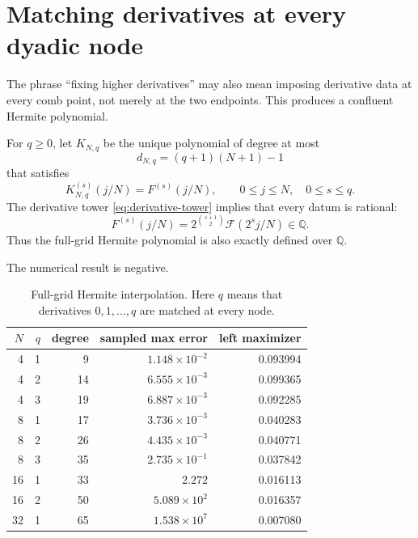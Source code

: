 \documentclass[11pt,oneside]{article}
\theoremstyle{definition}
\theoremstyle{remark}
\newcommand{\Q}{\mathbb Q}
\newcommand{\Fext}{\mathcal F}
\begin{document}
\section{Matching derivatives at every dyadic node}
\label{sec:full-hermite}

The phrase ``fixing higher derivatives'' may also mean imposing derivative data at every comb point, not merely at the two endpoints.  This produces a confluent Hermite polynomial.

For $q\ge0$, let $K_{N,q}$ be the unique polynomial of degree at most
\begin{equation}
 d_{N,q}=(q+1)(N+1)-1
 \label{eq:full-hermite-degree}
\end{equation}
that satisfies
\begin{equation}
 K_{N,q}^{(s)}(j/N)=F^{(s)}(j/N),
 \qquad 0\le j\le N,\quad0\le s\le q.
 \label{eq:full-hermite-conditions}
\end{equation}
The derivative tower \eqref{eq:derivative-tower} implies that every datum is rational:
\begin{equation}
 F^{(s)}(j/N)=2^{\binom{s+1}{2}}\Fext(2^s j/N)\in\Q.
 \label{eq:dyadic-derivatives}
\end{equation}
Thus the full-grid Hermite polynomial is also exactly defined over $\Q$.

The numerical result is negative.

\begin{table}[htbp]
\centering
\caption{Full-grid Hermite interpolation.  Here $q$ means that derivatives $0,1,\ldots,q$ are matched at every node.}
\label{tab:full-hermite}
\begin{tabular}{rrrrr}
\toprule
$N$ & $q$ & degree & sampled max error & left maximizer \\
\midrule
4  & 1 & 9  & $1.148\times10^{-2}$ & 0.093994 \\
4  & 2 & 14 & $6.555\times10^{-3}$ & 0.099365 \\
4  & 3 & 19 & $6.887\times10^{-3}$ & 0.092285 \\
8  & 1 & 17 & $3.736\times10^{-3}$ & 0.040283 \\
8  & 2 & 26 & $4.435\times10^{-3}$ & 0.040771 \\
8  & 3 & 35 & $2.735\times10^{-1}$ & 0.037842 \\
16 & 1 & 33 & $2.272$ & 0.016113 \\
16 & 2 & 50 & $5.089\times10^{2}$ & 0.016357 \\
32 & 1 & 65 & $1.538\times10^{7}$ & 0.007080 \\
\bottomrule
\end{tabular}
\end{table}
\end{document}
